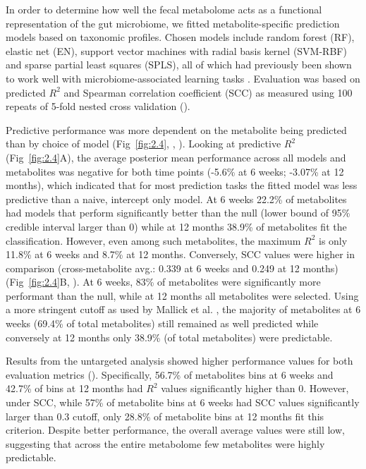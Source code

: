 In order to determine how well the fecal metabolome acts as a functional representation of the gut microbiome, we fitted metabolite-specific prediction models based on taxonomic profiles. Chosen models include random forest (RF), elastic net (EN), support vector machines with radial basis kernel (SVM-RBF) and sparse partial least squares (SPLS), all of which had previously been shown to work well with microbiome-associated learning tasks \cite{zhou2019review}. Evaluation was based on predicted $R^2$ and Spearman correlation coefficient (SCC) as measured using 100 repeats of 5-fold nested cross validation (). 

Predictive performance was more dependent on the metabolite being predicted than by choice of model (Fig~\ref{fig:2.4}, , ). Looking at predictive $R^2$ (Fig~\ref{fig:2.4}A), the average posterior mean performance across all models and metabolites was negative for both time points (-5.6\% at 6 weeks; -3.07\% at 12 months), which indicated that for most prediction tasks the fitted model was less predictive than a naive, intercept only model. At 6 weeks 22.2\% of metabolites had models that perform significantly better than the null (lower bound of 95\% credible interval larger than 0) while at 12 months 38.9\% of metabolites fit the classification. However, even among such metabolites, the maximum $R^2$ is only 11.8\% at 6 weeks and 8.7\% at 12 months. Conversely, SCC values were higher in comparison (cross-metabolite avg.: 0.339 at 6 weeks and 0.249 at 12 months) (Fig~\ref{fig:2.4}B, ). At 6 weeks, 83\% of metabolites were significantly more performant than the null, while at 12 months all metabolites were selected. Using a more stringent cutoff as used by Mallick et al. \cite{mallick2019predictive}, the majority of metabolites at 6 weeks (69.4\% of total metabolites) still remained as well predicted while conversely at 12 months only 38.9\% (of total metabolites) were predictable. 

Results from the untargeted analysis showed higher performance values for both evaluation metrics (). Specifically, 56.7\% of metabolites bins at 6 weeks and 42.7\% of bins at 12 months had $R^2$ values significantly higher than 0. However, under SCC, while 57\% of metabolite bins at 6 weeks had SCC values significantly larger than 0.3 cutoff, only 28.8\% of metabolite bins at 12 months fit this criterion. Despite better performance, the overall average values were still low, suggesting that across the entire metabolome few metabolites were highly predictable.  

